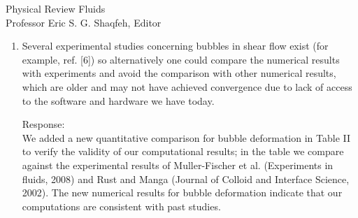\documentclass{letter}
\begin{document}
\begin{letter}{
Physical Review Fluids\\
Professor Eric S. G. Shaqfeh, Editor\\}
\begin{enumerate}
Our simulations were performed under stringent computational settings, in terms
of domain sizes and grid resolutions, selected to guarantee a minimum accuracy
in our numerical results.  The critical $Re$ numbers found from the bubble
simulations presented in this study will provide a minimum standard for future
studies.  Anticipating future increased computational resources and the
development of new numerical algorithms, we have added the following comment:
Additional grid refinements may be desirable to perform further accuracy
evaluations for bubble deformation and breakup.  (see the last line at the
section “C. Consideration of domain and grid sizes”, Page 9)

Regarding the refinement level of AMR, the use of 3-4 consecutive refinement levels is not
always preferred.  A small refinement level is rather suitable in terms of
stable computations and we found that our mesh setting for this purpose was
reasonable.

{\color{red}
We briefly described the type of time discretization, the temporal discretization, 
and the algorithm of our numerical method. Also, we have added information 
on our paper as a reference to obtain more details about the numerical method used in 
this study.}
\\

\par\noindent
\item
\textsf
{\color{red} Several experimental studies concerning bubbles in shear flow
exist (for example, ref. [6]) so alternatively one could compare the numerical
results with experiments and avoid the comparison with other numerical results,
which are older and may not have achieved convergence due to lack of access to
the software and hardware we have today.}
\vspace{3 mm}

Response: \\
{\color{red} 
We added a new quantitative comparison for bubble deformation in Table
I\hspace{-1.2pt}I to verify the validity of our computational results; in the
table we compare against the experimental results of Muller-Fischer et al.
(Experiments in fluids, 2008) and Rust and Manga (Journal of Colloid and
Interface Science, 2002). The new numerical results for bubble deformation
indicate that our computations are consistent with past studies.
}
\\


\end{enumerate}
\end{letter}
\end{document}

